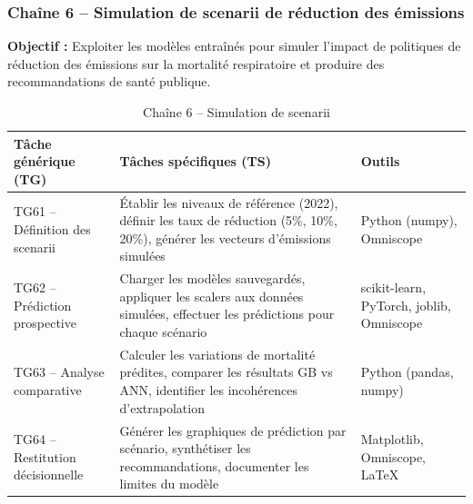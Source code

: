 \documentclass[11pt,a4paper]{article}
\begin{document}
\clearpage
\subsubsection{Chaîne 6 -- Simulation de scenarii de réduction des émissions}

\textbf{Objectif :} Exploiter les modèles entraînés pour simuler l'impact de politiques de réduction des émissions sur la mortalité respiratoire et produire des recommandations de santé publique.

\begin{table}[H]
\centering
\caption{Chaîne 6 -- Simulation de scenarii}
\begin{tabular}{p{3.5cm}p{5.5cm}p{4.5cm}}
\toprule
\textbf{Tâche générique (TG)} & \textbf{Tâches spécifiques (TS)} & \textbf{Outils} \\
\midrule
TG61 -- Définition des scenarii & Établir les niveaux de référence (2022), définir les taux de réduction (5\%, 10\%, 20\%), générer les vecteurs d'émissions simulées & Python (numpy), Omniscope \\
\midrule
TG62 -- Prédiction prospective & Charger les modèles sauvegardés, appliquer les scalers aux données simulées, effectuer les prédictions pour chaque scénario & scikit-learn, PyTorch, joblib, Omniscope \\
\midrule
TG63 -- Analyse comparative & Calculer les variations de mortalité prédites, comparer les résultats GB vs ANN, identifier les incohérences d'extrapolation & Python (pandas, numpy) \\
\midrule
TG64 -- Restitution décisionnelle & Générer les graphiques de prédiction par scénario, synthétiser les recommandations, documenter les limites du modèle & Matplotlib, Omniscope, LaTeX \\
\bottomrule
\end{tabular}
\end{table}
\end{document}
